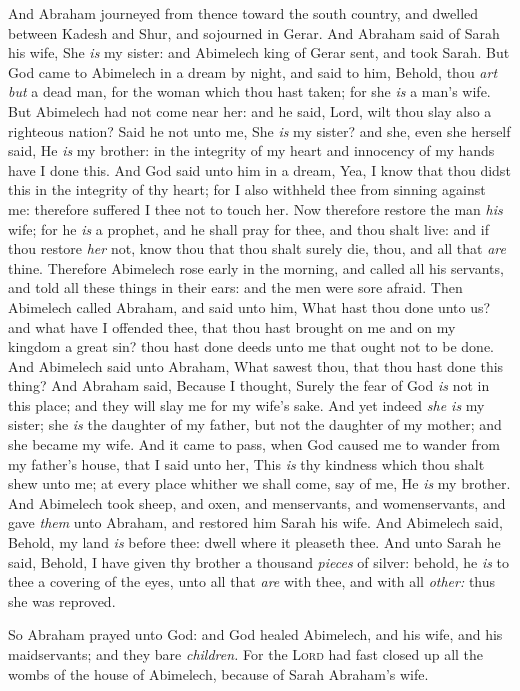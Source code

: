 \documentclass[11pt,letterpaper,oneside]{memoir}
\begin{document}
And Abraham journeyed from thence toward the south country, and dwelled
between Kadesh and Shur, and sojourned in Gerar. And Abraham said of
Sarah his wife, She \emph{is} my sister: and Abimelech king of Gerar
sent, and took Sarah. But God came to Abimelech in a dream by night, and
said to him, Behold, thou \emph{art but} a dead man, for the woman which
thou hast taken; for she \emph{is} a man's wife. But Abimelech had not
come near her: and he said, Lord, wilt thou slay also a righteous
nation? Said he not unto me, She \emph{is} my sister? and she, even she
herself said, He \emph{is} my brother: in the integrity of my heart and
innocency of my hands have I done this. And God said unto him in a
dream, Yea, I know that thou didst this in the integrity of thy heart;
for I also withheld thee from sinning against me: therefore suffered I
thee not to touch her. Now therefore restore the man \emph{his} wife;
for he \emph{is} a prophet, and he shall pray for thee, and thou shalt
live: and if thou restore \emph{her} not, know thou that thou shalt
surely die, thou, and all that \emph{are} thine. Therefore Abimelech
rose early in the morning, and called all his servants, and told all
these things in their ears: and the men were sore afraid. Then Abimelech
called Abraham, and said unto him, What hast thou done unto us? and what
have I offended thee, that thou hast brought on me and on my kingdom a
great sin? thou hast done deeds unto me that ought not to be done. And
Abimelech said unto Abraham, What sawest thou, that thou hast done this
thing? And Abraham said, Because I thought, Surely the fear of God
\emph{is} not in this place; and they will slay me for my wife's sake.
And yet indeed \emph{she is} my sister; she \emph{is} the daughter of my
father, but not the daughter of my mother; and she became my wife. And
it came to pass, when God caused me to wander from my father's house,
that I said unto her, This \emph{is} thy kindness which thou shalt shew
unto me; at every place whither we shall come, say of me, He \emph{is}
my brother. And Abimelech took sheep, and oxen, and menservants, and
womenservants, and gave \emph{them} unto Abraham, and restored him Sarah
his wife. And Abimelech said, Behold, my land \emph{is} before thee:
dwell where it pleaseth thee. And unto Sarah he said, Behold, I have
given thy brother a thousand \emph{pieces} of silver: behold, he
\emph{is} to thee a covering of the eyes, unto all that \emph{are} with
thee, and with all \emph{other:} thus she was reproved.

So Abraham prayed unto God: and God healed Abimelech, and his wife, and
his maidservants; and they bare \emph{children. }For the \textsc{Lord} had
fast closed up all the wombs of the house of Abimelech, because of Sarah
Abraham's wife.
\end{document}
